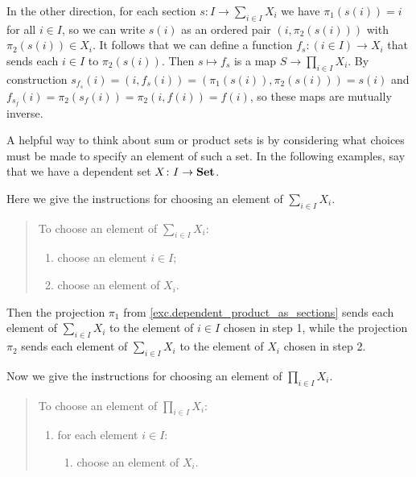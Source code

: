 \documentclass[Book-Poly]{subfiles}
\begin{document}
\begin{exercise}
\begin{solution}
\begin{enumerate}
    In the other direction, for each section $s \colon I \to \sum_{i \in I} X_i$ we have $\pi_1(s(i)) = i$ for all $i \in I$, so we can write $s(i)$ as an ordered pair $(i, \pi_2(s(i)))$ with $\pi_2(s(i)) \in X_i$.
    It follows that we can define a function $f_s \colon (i \in I) \to X_i$ that sends each $i \in I$ to  $\pi_2(s(i))$.
    Then $s \mapsto f_s$ is a map $S \to \prod_{i \in I} X_i$.
    By construction $s_{f_s}(i) = (i, f_s(i)) = (\pi_1(s(i)), \pi_2(s(i))) = s(i)$ and $f_{s_f}(i) = \pi_2(s_f(i)) = \pi_2(i, f(i)) = f(i)$, so these maps are mutually inverse.
\end{enumerate}
\end{solution}
\end{exercise}

A helpful way to think about sum or product sets is by considering what choices must be made to specify an element of such a set.
In the following examples, say that we have a dependent set $X \colon I \to \textbf{Set}$.

Here we give the instructions for choosing an element of $\sum_{i \in I} X_i$.

\begin{quote}
To choose an element of $\sum_{i \in I} X_i$: 
\begin{enumerate}
    \item choose an element $i \in I$;
    \item choose an element of $X_i$.
\end{enumerate}
\end{quote}

Then the projection $\pi_1$ from \cref{exc.dependent_product_as_sections} sends each element of $\sum_{i \in I} X_i$ to the element of $i \in I$ chosen in step 1, while the projection $\pi_2$ sends each element of $\sum_{i \in I} X_i$ to the element of $X_i$ chosen in step 2.

Now we give the instructions for choosing an element of $\prod_{i \in I} X_i$.

\begin{quote}
To choose an element of $\prod_{i \in I} X_i$: 
\begin{enumerate}
    \item for each element $i \in I$:
    \begin{enumerate}[label=\arabic*.]
        \item choose an element of $X_i$.
    \end{enumerate}
\end{enumerate}
\end{quote}
\end{document}
